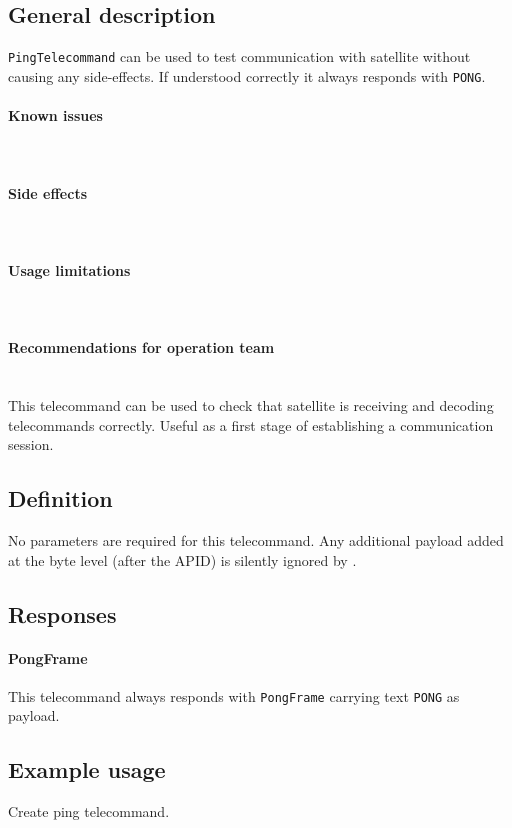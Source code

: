 

\subsection{General description}
\texttt{PingTelecommand} can be used to test communication with satellite without causing any side-effects. If understood correctly it always responds with \texttt{PONG}.

\paragraph{Known issues} \mbox{} \\
\None

\paragraph{Side effects} \mbox{} \\
\None

\paragraph{Usage limitations} \mbox{} \\
\None

\paragraph{Recommendations for operation team} \mbox{} \\
This telecommand can be used to check that satellite is receiving and decoding telecommands correctly. Useful as a first stage of establishing a communication session.

\subsection{Definition}

No parameters are required for this telecommand. Any additional payload added at the byte level (after the APID) is silently ignored by \obc.

\subsection{Responses}

\paragraph{PongFrame}
This telecommand always responds with \texttt{PongFrame} carrying text \texttt{PONG} as payload.

\subsection{Example usage}
Create ping telecommand.

